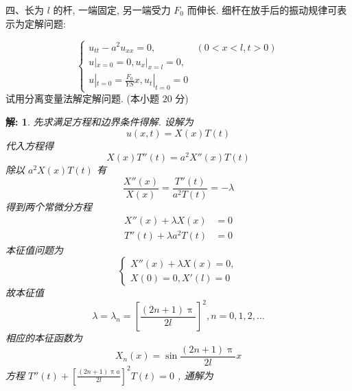 \documentclass{article}
\theoremstyle{nonumberplain}
\newtheorem{solution}{\textcolor{gr}{解:}}
\begin{document}
    
    \begin{flushleft}
    	四、长为 $l$ 的杆, 一端固定, 另一端受力 $F_{0}$ 而伸长. 细杆在放手后的振动规律可表示为定解问题:
    \end{flushleft}
    \begin{equation*}
    \begin{cases}
    u_{tt}-a^2 u_{xx}=0, & (0<x<l,t>0)\\
    u|_{x=0}=0,u_{x}|_{x=l}=0,\\
    u|_{t=0}=\frac{F_{0}}{YS}x,u_{t}|_{t=0}=0
    \end{cases}
    \end{equation*}
    试用分离变量法解定解问题. (本小题 $20$ 分)
    \begin{solution}
    	先求满足方程和边界条件得解. 设解为
    	\begin{equation*}
    	u(x,t)=X(x)T(t)\tag*{$\cdots\cdots2$分}
    	\end{equation*}
    	代入方程得
    	\begin{equation*}
    		X(x)T''(t)=a^2 X''(x)T(t)
    	\end{equation*}
    	除以 $a^2 X(x)T(t)$ 有
    	\begin{equation*}
    		\frac{X''(x)}{X(x)}=\frac{T''(t)}{a^2 T(t)}=-\lambda\tag*{$\cdots\cdots2$分}
    	\end{equation*}
    	得到两个常微分方程
    	\begin{align*}
    		X''(x)+\lambda X(x)&=0\\
    		T''(t)+\lambda a^2 T(t)&=0\tag*{$\cdots\cdots2$分}
    	\end{align*}
    	本征值问题为
    	\begin{equation*}
    		\begin{cases}
    		X''(x)+\lambda X(x)=0,\\
    		X(0)=0,X'(l)=0
    		\end{cases}
    	\end{equation*}
    	故本征值
    	\begin{equation*}
    		\lambda=\lambda_{n}=\left[ \frac{(2n+1)\uppi}{2l} \right]^2,n=0,1,2,\ldots\tag*{$\cdots\cdots2$分}
    	\end{equation*}
    	相应的本征函数为
    	\begin{equation*}
    		X_{n}(x)=\sin\frac{(2n+1)\uppi}{2l}x\tag*{$\cdots\cdots2$分}
    	\end{equation*}
    	方程 $T''(t)+\left[ \frac{(2n+1)\uppi a}{2l} \right]^2 T(t)=0$ , 通解为
    	\begin{equation*}

\end{equation*}
\end{solution}
\end{document}
